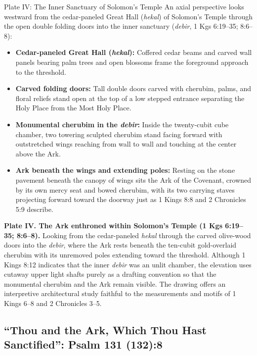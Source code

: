 \else
\begin{studybox}{Plate IV: The Inner Sanctuary of Solomon's Temple}
An axial perspective looks westward from the cedar-paneled Great Hall (\textit{hekal}) of Solomon's Temple through the open double folding doors into the inner sanctuary (\textit{debir}, 1 Kgs 6:19--35; 8:6--8):
\begin{itemize}
  \item \textbf{Cedar-paneled Great Hall (\textit{hekal}):} Coffered cedar beams and carved wall panels bearing palm trees and open blossoms frame the foreground approach to the threshold.
  \item \textbf{Carved folding doors:} Tall double doors carved with cherubim, palms, and floral reliefs stand open at the top of a low stepped entrance separating the Holy Place from the Most Holy Place.
  \item \textbf{Monumental cherubim in the \textit{debir}:} Inside the twenty-cubit cube chamber, two towering sculpted cherubim stand facing forward with outstretched wings reaching from wall to wall and touching at the center above the Ark.
  \item \textbf{Ark beneath the wings and extending poles:} Resting on the stone pavement beneath the canopy of wings sits the Ark of the Covenant, crowned by its own mercy seat and bowed cherubim, with its two carrying staves projecting forward toward the doorway just as 1 Kings 8:8 and 2 Chronicles 5:9 describe.
\end{itemize}
\end{studybox}
\fi

\begin{platecaption}
\textbf{Plate IV. The Ark enthroned within Solomon's Temple (1 Kgs 6:19--35; 8:6--8).} Looking from the cedar-paneled \textit{hekal} through the carved olive-wood doors into the \textit{debir}, where the Ark rests beneath the ten-cubit gold-overlaid cherubim with its unremoved poles extending toward the threshold. Although 1 Kings 8:12 indicates that the inner \textit{debir} was an unlit chamber, the elevation uses cutaway upper light shafts purely as a drafting convention so that the monumental cherubim and the Ark remain visible. The drawing offers an interpretive architectural study faithful to the measurements and motifs of 1 Kings 6--8 and 2 Chronicles 3--5.
\end{platecaption}

\subsection{``Thou and the Ark, Which Thou Hast Sanctified'': Psalm 131 (132):8}

